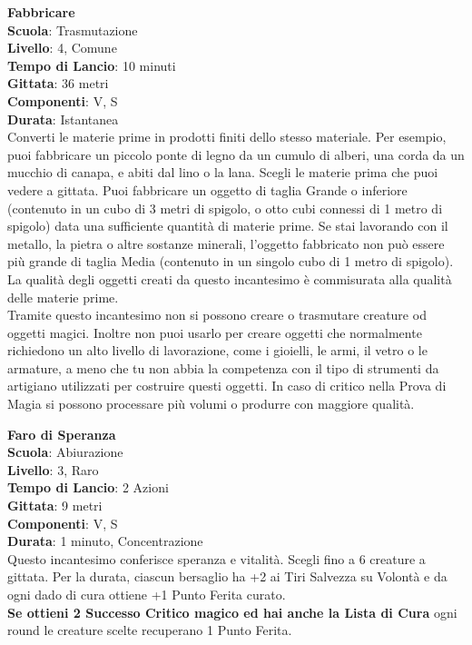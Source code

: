 \begin{multicols}{2}
\medskip\textbf{Fabbricare}\\
\textbf{Scuola}: Trasmutazione\\
\textbf{Livello}: 4, Comune\\
\textbf{Tempo di Lancio}: 10 minuti\\
\textbf{Gittata}: 36 metri\\
\textbf{Componenti}: V, S\\
\textbf{Durata}: Istantanea\\
Converti le materie prime in prodotti finiti dello stesso materiale. Per esempio, puoi fabbricare un piccolo ponte di legno da un cumulo di alberi, una corda da un mucchio di canapa, e abiti dal lino o la lana. Scegli le materie prima che puoi vedere a gittata. Puoi fabbricare un oggetto di taglia Grande o inferiore (contenuto in un cubo di 3 metri di spigolo, o otto cubi connessi di 1 metro di spigolo) data una sufficiente quantità di materie prime. Se stai lavorando con il metallo, la pietra o altre sostanze minerali, l'oggetto fabbricato non può essere più grande di taglia Media (contenuto in un singolo cubo di 1 metro di spigolo). La qualità degli oggetti creati da questo incantesimo è commisurata alla qualità delle materie prime.\\
Tramite questo incantesimo non si possono creare o trasmutare creature od oggetti magici. Inoltre non puoi usarlo per creare oggetti che normalmente richiedono un alto livello di lavorazione, come i gioielli, le armi, il vetro o le armature, a meno che tu non abbia la competenza con il tipo di strumenti da artigiano utilizzati per costruire questi oggetti. In caso di critico nella Prova di Magia si possono processare più volumi o produrre con maggiore qualità.

\medskip\textbf{Faro di Speranza}\\
\textbf{Scuola}: Abiurazione\\
\textbf{Livello}: 3, Raro\\
\textbf{Tempo di Lancio}: 2 Azioni\\
\textbf{Gittata}: 9 metri\\
\textbf{Componenti}: V, S\\
\textbf{Durata}: 1 minuto, Concentrazione\\
Questo incantesimo conferisce speranza e vitalità. Scegli fino a 6 creature a gittata. Per la durata, ciascun bersaglio ha +2 ai Tiri Salvezza su Volontà e da ogni dado di cura ottiene +1 Punto Ferita curato.\\
\textbf{Se ottieni 2 Successo Critico magico ed hai anche la Lista di Cura} ogni round le creature scelte recuperano 1 Punto Ferita.


\end{multicols}

